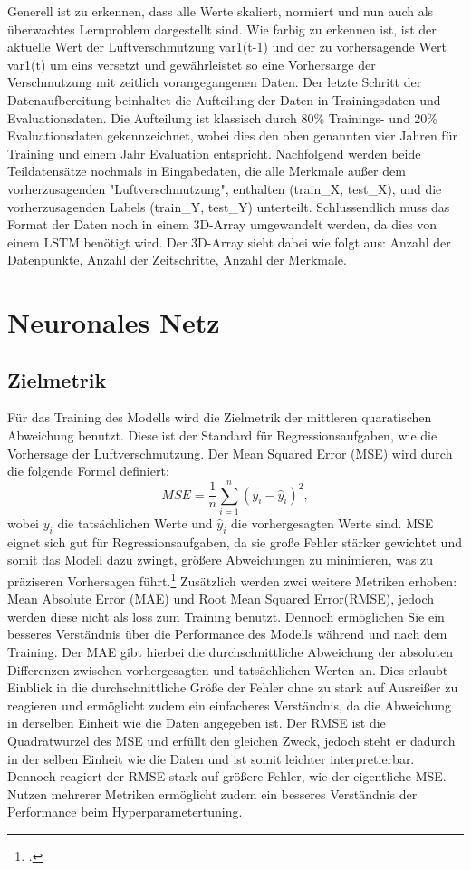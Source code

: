 \documentclass{article}
\begin{document}
Generell ist zu erkennen, dass alle Werte skaliert, normiert und nun auch als überwachtes Lernproblem dargestellt sind. 
Wie farbig zu erkennen ist, ist der aktuelle Wert der Luftverschmutzung var1(t-1) und der zu vorhersagende Wert var1(t) um eins versetzt und gewährleistet so eine Vorhersarge der Verschmutzung mit zeitlich vorangegangenen Daten.
Der letzte Schritt der Datenaufbereitung beinhaltet die Aufteilung der Daten in Trainingsdaten und Evaluationsdaten. 
Die Aufteilung ist klassisch durch 80\% Trainings- und 20\% Evaluationsdaten gekennzeichnet, wobei dies den oben genannten vier Jahren für Training und einem Jahr Evaluation entspricht.
Nachfolgend werden beide Teildatensätze nochmals in Eingabedaten, die alle Merkmale außer dem vorherzusagenden "Luftverschmutzung",
enthalten (train\_X, test\_X), und die vorherzusagenden Labels (train\_Y, test\_Y) unterteilt. 
Schlussendlich muss das Format der Daten noch in einem 3D-Array umgewandelt werden, da dies von einem LSTM benötigt wird.
Der 3D-Array sieht dabei wie folgt aus: Anzahl der Datenpunkte, Anzahl der Zeitschritte, Anzahl der Merkmale.


\section{Neuronales Netz}
\subsection{Zielmetrik}
Für das Training des Modells wird die Zielmetrik der mittleren quaratischen Abweichung benutzt.
Diese ist der Standard für Regressionsaufgaben, wie die Vorhersage der Luftverschmutzung. 
Der Mean Squared Error (MSE) wird durch die folgende Formel definiert:
\begin{equation}
MSE = \frac{1}{n} \sum_{i=1}^{n} (y_i - \hat{y}_i)^2,
\end{equation}
wobei \( y_i \) die tatsächlichen Werte und \( \hat{y}_i \) die vorhergesagten Werte sind. MSE eignet sich gut für Regressionsaufgaben, da sie große Fehler stärker gewichtet und somit das Modell dazu zwingt, größere Abweichungen zu minimieren, was zu präziseren Vorhersagen führt.\footcite[vgl.][672]{LinearRegressionVs}
Zusätzlich werden zwei weitere Metriken erhoben: Mean Absolute Error (MAE) und Root Mean Squared Error(RMSE), jedoch werden diese nicht als loss zum Training benutzt. 
Dennoch ermöglichen Sie ein besseres Verständnis über die Performance des Modells während und nach dem Training. 
Der MAE gibt hierbei die durchschnittliche Abweichung der absoluten Differenzen zwischen vorhergesagten und tatsächlichen Werten an.
Dies erlaubt Einblick in die durchschnittliche Größe der Fehler ohne zu stark auf Ausreißer zu reagieren und ermöglicht zudem ein einfacheres Verständnis,
da die Abweichung in derselben Einheit wie die Daten angegeben ist.
Der RMSE ist die Quadratwurzel des MSE und erfüllt den gleichen Zweck, jedoch steht er dadurch in der selben Einheit wie die Daten und ist somit leichter interpretierbar. 
Dennoch reagiert der RMSE stark auf größere Fehler, wie der eigentliche MSE.
Nutzen mehrerer Metriken ermöglicht zudem ein besseres Verständnis der Performance beim Hyperparametertuning. 
\end{document}
